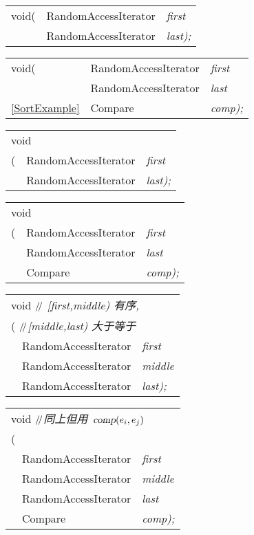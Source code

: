 \documentclass[c5size,landscape,twoside,a4paper]{ctexart}
\makeatletter
\newif\ifafour
\newif\ifletter
\let\ifafour\iftrue
\let\ifletter\iffalse
\newcommand{\<}{\ensuremath{\langle}}
\renewcommand{\>}{\ensuremath{\rangle}}
\newcommand{\Compare}{{{\bbfont C}\concfont ompare}}
\newcommand{\RandomAccessIterator}{{{\bbfont R}\concfont andomAccessIterator}}
\newcommand{\seeExample}{{\normalsize\Pisymbol{pzd}{43}}}
\newcommand{\slsl}{\ensuremath{/\kern-.2em/}} %
\newcommand{\textComm}[1]{\textsl{\textsf{#1}}}
\newcommand{\Cppslsl}{\enskip\slsl\enskip}
\newcommand{\CppComm}[1]{\Cppslsl\textComm{#1}}
\newcommand{\asbutusing}{同上但用}
\newcommand{\commcr}{{\normalfont{,}} \\}
\newcommand{\doColorNamed}[2]{\color[named]{#1}{#2}}
\newcommand{\doColorNamed}[2]{#2}
\newcommand{\StrongClrBf}[1]{{\small\doColorNamed{Red}\textbf{#1}}}
\newenvironment{funcdec}
 { %
   \ifletter
     \setlength{\extrarowheight}{-2pt}
   \else
     \setlength{\extrarowheight}{-4pt}
   \fi
        \setlength{\tabcolsep}{0pt}
   \begin{tabular}{ll @{\quad}>{\slshape}l}}
 {\end{tabular}}
\newcommand{\lp}{(}
\newcommand{\rp}{)}
\newcommand{\lbrk}{[}
\newcommand{\parVal}[2]{{\slshape#1}{\textnormal#2}}
\newcommand{\lastPar}[1]{\parVal{#1}{\rp;}}
\newcommand{\range}[2]{\lbrk#1,#2\rp}
\makeatother
\begin{document}
\begin{multicols}{4}
\begin{funcdec}
void\enskip \StrongClrBf{sort}\lp&\RandomAccessIterator & first\commcr
                                 &\RandomAccessIterator & \lastPar{last}
\end{funcdec}


\begin{funcdec}
void\enskip \StrongClrBf{sort}\lp&\RandomAccessIterator & first\commcr
                                 &\RandomAccessIterator & last\commcr
\quad\seeExample\ref{SortExample}&\Compare              & \lastPar{comp}
\end{funcdec}


\begin{funcdec}
\multicolumn{3}{l}{void}\\
\StrongClrBf{stable_sort}\lp&\RandomAccessIterator & first\commcr
                            &\RandomAccessIterator & \lastPar{last}
\end{funcdec}


\begin{funcdec}
\multicolumn{3}{l}{void}\\
\StrongClrBf{stable_sort}\lp&\RandomAccessIterator & first\commcr
                            &\RandomAccessIterator & last\commcr
                            &\Compare              & \lastPar{comp}
\end{funcdec}


\begin{funcdec}
\multicolumn{3}{l}{void \hfill\CppComm{
   \range{\textsl{first}}{\textsl{middle}} 有序,}}\\
\multicolumn{3}{l}{\StrongClrBf{partial_sort}\lp
   \hfill\CppComm{\range{\textsl{middle}}{\textsl{last}} 大于等于}}\\
\phantom{ABC}&\RandomAccessIterator & first\commcr
             &\RandomAccessIterator & middle\commcr
             &\RandomAccessIterator & \lastPar{last}
\end{funcdec}


\begin{funcdec}
\multicolumn{3}{l}{void 
    \CppComm{\asbutusing\ \(\textsl{comp}(e_i,e_j)\)}} \\
\multicolumn{3}{l}{\StrongClrBf{partial_sort}\lp}\\
\phantom{ABC}&\RandomAccessIterator & first\commcr
             &\RandomAccessIterator & middle\commcr
             &\RandomAccessIterator & last\commcr
             &\Compare              & \lastPar{comp}
\end{funcdec}



\end{multicols}
\end{document}
